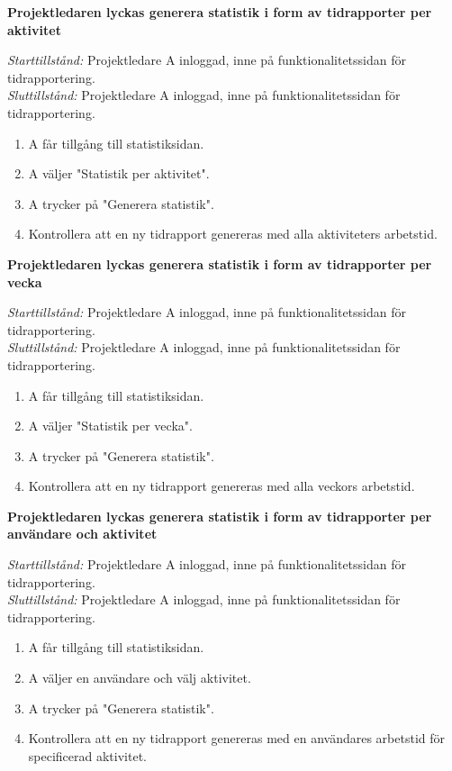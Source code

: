 \documentclass[a4paper]{article}
\begin{document}
\begin{FT}
\item
\textbf{Projektledaren lyckas generera statistik i form av tidrapporter per aktivitet}

\emph{Starttillstånd:} Projektledare A inloggad, inne på funktionalitetssidan för tidrapportering.\\
\emph{Sluttillstånd:} Projektledare A inloggad, inne på funktionalitetssidan för tidrapportering.

\begin{enumerate}
\item A får tillgång till statistiksidan.
\item A väljer "Statistik per aktivitet".
\item A trycker på "Generera statistik".
\item Kontrollera att en ny tidrapport genereras med alla aktiviteters arbetstid.
\end{enumerate}


\item
\textbf{Projektledaren lyckas generera statistik i form av tidrapporter per vecka}

\emph{Starttillstånd:} Projektledare A inloggad, inne på funktionalitetssidan för tidrapportering.\\
\emph{Sluttillstånd:} Projektledare A inloggad, inne på funktionalitetssidan för tidrapportering.

\begin{enumerate}
\item A får tillgång till statistiksidan.
\item A väljer "Statistik per vecka".
\item A trycker på "Generera statistik".
\item Kontrollera att en ny tidrapport genereras med alla veckors arbetstid.
\end{enumerate}


\item
\textbf{Projektledaren lyckas generera statistik i form av tidrapporter per användare och aktivitet}

\emph{Starttillstånd:} Projektledare A inloggad, inne på funktionalitetssidan för tidrapportering.\\
\emph{Sluttillstånd:} Projektledare A inloggad, inne på funktionalitetssidan för tidrapportering.

\begin{enumerate}
\item A får tillgång till statistiksidan.
\item A väljer en användare och välj aktivitet.
\item A trycker på "Generera statistik".
\item Kontrollera att en ny tidrapport genereras med en användares arbetstid för specificerad aktivitet.
\end{enumerate}



\end{FT}
\end{document}

